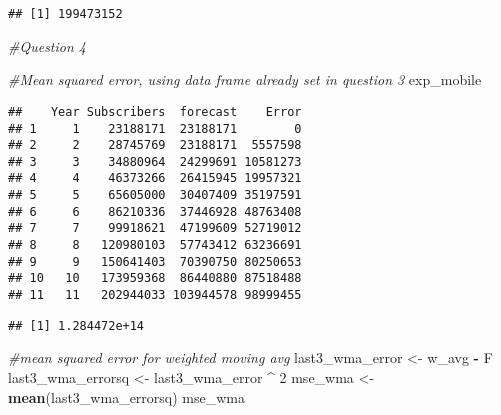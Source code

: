 \documentclass[]{article}
\newenvironment{Shaded}{\begin{snugshade}}{\end{snugshade}}
\newcommand{\KeywordTok}[1]{\textcolor[rgb]{0.13,0.29,0.53}{\textbf{#1}}}
\newcommand{\DecValTok}[1]{\textcolor[rgb]{0.00,0.00,0.81}{#1}}
\newcommand{\StringTok}[1]{\textcolor[rgb]{0.31,0.60,0.02}{#1}}
\newcommand{\CommentTok}[1]{\textcolor[rgb]{0.56,0.35,0.01}{\textit{#1}}}
\newcommand{\OperatorTok}[1]{\textcolor[rgb]{0.81,0.36,0.00}{\textbf{#1}}}
\newcommand{\NormalTok}[1]{#1}
\begin{document}
\begin{verbatim}
## [1] 199473152
\end{verbatim}

\begin{Shaded}
\begin{Highlighting}[]
\CommentTok{#Question 4}


\CommentTok{#Mean squared error, using data frame already set in question 3}
\NormalTok{exp_mobile}
\end{Highlighting}
\end{Shaded}

\begin{verbatim}
##    Year Subscribers  forecast    Error
## 1     1    23188171  23188171        0
## 2     2    28745769  23188171  5557598
## 3     3    34880964  24299691 10581273
## 4     4    46373266  26415945 19957321
## 5     5    65605000  30407409 35197591
## 6     6    86210336  37446928 48763408
## 7     7    99918621  47199609 52719012
## 8     8   120980103  57743412 63236691
## 9     9   150641403  70390750 80250653
## 10   10   173959368  86440880 87518488
## 11   11   202944033 103944578 98999455
\end{verbatim}

\begin{Shaded}
\end{Shaded}

\begin{verbatim}
## [1] 1.284472e+14
\end{verbatim}

\begin{Shaded}
\begin{Highlighting}[]
\CommentTok{#mean squared error for weighted moving avg}
\NormalTok{last3_wma_error <-}\StringTok{ }\NormalTok{w_avg }\OperatorTok{-}\StringTok{ }\NormalTok{F}
\NormalTok{last3_wma_errorsq <-}\StringTok{ }\NormalTok{last3_wma_error }\OperatorTok{^}\StringTok{ }\DecValTok{2}
\NormalTok{mse_wma <-}\StringTok{ }\KeywordTok{mean}\NormalTok{(last3_wma_errorsq)}
\NormalTok{mse_wma}
\end{Highlighting}
\end{Shaded}
\end{document}
